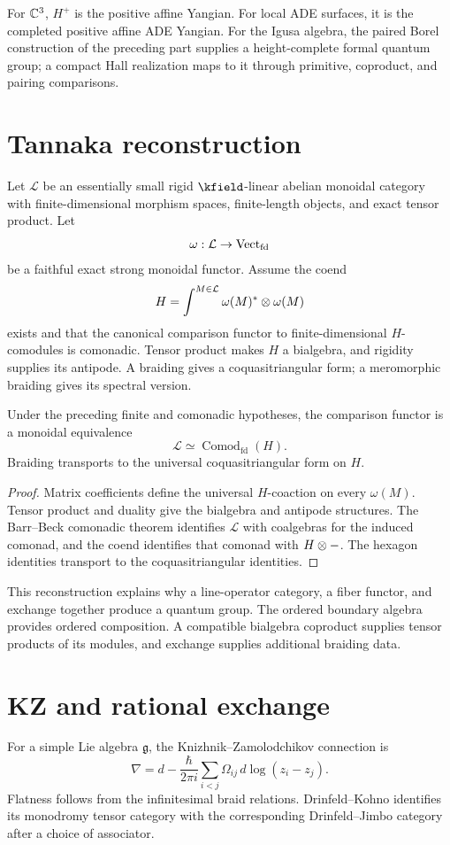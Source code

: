 For $\mathbb C^3$, $H^+$ is the positive affine Yangian. For local ADE surfaces, it is the completed positive affine ADE Yangian. For the Igusa algebra, the paired Borel construction of the preceding part supplies a height-complete formal quantum group; a compact Hall realization maps to it through primitive, coproduct, and pairing comparisons.

\chapter{Tannaka reconstruction}
Let $\mathcal L$ be an essentially small rigid $\kfield$-linear abelian monoidal category with finite-dimensional morphism spaces, finite-length objects, and exact tensor product. Let
\[
 \omega:\mathcal L\to\operatorname{Vect}_{\mathrm{fd}}
\]
be a faithful exact strong monoidal functor. Assume the coend
\[
 H=\int^{M\in\mathcal L}\omega(M)^*\otimes\omega(M)
\]
exists and that the canonical comparison functor to finite-dimensional $H$-comodules is comonadic. Tensor product makes $H$ a bialgebra, and rigidity supplies its antipode. A braiding gives a coquasitriangular form; a meromorphic braiding gives its spectral version.

\begin{theorem}
Under the preceding finite and comonadic hypotheses, the comparison functor is a monoidal equivalence
\[
 \mathcal L\simeq\operatorname{Comod}_{\mathrm{fd}}(H).
\]
Braiding transports to the universal coquasitriangular form on $H$.
\end{theorem}
\begin{proof}
Matrix coefficients define the universal $H$-coaction on every $\omega(M)$. Tensor product and duality give the bialgebra and antipode structures. The Barr--Beck comonadic theorem identifies $\mathcal L$ with coalgebras for the induced comonad, and the coend identifies that comonad with $H\otimes-$. The hexagon identities transport to the coquasitriangular identities.
\end{proof}

This reconstruction explains why a line-operator category, a fiber functor, and exchange together produce a quantum group. The ordered boundary algebra provides ordered composition.  A compatible bialgebra coproduct supplies tensor products of its modules, and exchange supplies additional braiding data.

\chapter{KZ and rational exchange}
For a simple Lie algebra $\mathfrak g$, the Knizhnik--Zamolodchikov connection is
\[
 \nabla=d-\frac{\hbar}{2\pi i}
 \sum_{i<j}\Omega_{ij}\,d\log(z_i-z_j).
\]
Flatness follows from the infinitesimal braid relations. Drinfeld--Kohno identifies its monodromy tensor category with the corresponding Drinfeld--Jimbo category after a choice of associator.

